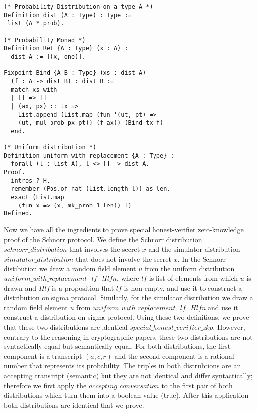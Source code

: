 \documentclass[conference,compsoc]{IEEEtran}
\begin{document}
\begin{lstlisting}[frame=single, language=Coq, caption={Definition of Uniform Probability Distribution},
    label={prob_def},captionpos=t, basicstyle=\ttfamily\footnotesize,
    abovecaptionskip=-\medskipamount]
(* Probability Distribution on a type A *)
Definition dist (A : Type) : Type := 
 list (A * prob).
  
(* Probability Monad *)
Definition Ret {A : Type} (x : A) : 
  dist A := [(x, one)].

Fixpoint Bind {A B : Type} (xs : dist A)  
  (f : A -> dist B) : dist B := 
  match xs with 
  | [] => [] 
  | (ax, px) :: tx => 
    List.append (List.map (fun '(ut, pt) => 
    (ut, mul_prob px pt)) (f ax)) (Bind tx f)
  end.

(* Uniform distribution *)
Definition uniform_with_replacement {A : Type} : 
  forall (l : list A), l <> [] -> dist A.
Proof.
  intros ? H.
  remember (Pos.of_nat (List.length l)) as len.
  exact (List.map 
    (fun x => (x, mk_prob 1 len)) l).
Defined.
\end{lstlisting}

  
Now we have all the ingredients to prove special honest-verifier 
zero-knowledge proof of the Schnorr protocol. We define the 
Schnorr distribution $schnorr\_distribution$
that involves the secret $x$ and 
the simulator distribution $simulator\_distribution$
that does not involve the secret $x$. 
In the Schnorr distibution we draw 
a random field element $u$ from the uniform 
distribution $uniform\_with\_replacement \text{ }lf \text{ } Hlfn$,
where $lf$ is list of elements from which $u$
is drawn and $Hlf$ is a proposition that 
$lf$ is non-empty, and use it to construct 
a distribution on sigma protocol. Similarly, 
for the simulator distribution 
we draw a random field element $u$ from 
$uniform\_with\_replacement \text{ }lf \text{ } Hlfn$
and use it construct a distribution on sigma protocol. 
Using these two definitions, we prove that these two 
distributions are identical 
$special\_honest\_verifier\_zkp$. However, 
contrary to the reasoning in cryptographic papers, 
these two distributions are not syntactically equal but 
semantically equal. For both distributions, 
the first component is a transcript $(a, c, r)$ and 
the second component is a rational number that represents 
its probability. The triples in both distrubtions 
are an accepting transcript (semantic) but they 
are not identical and differ syntactically; 
therefore we first apply the 
$accepting\_conversation$ to the first pair of 
both distributions which turn them into 
a boolean value (true). After this  
application both distributions are identical 
that we prove. 
\end{document}
